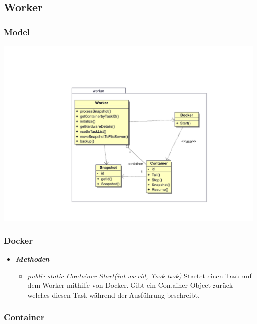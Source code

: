 \documentclass[a4paper,12pt]{article}
\begin{document}
\clearpage


\subsection{Worker}

\subsubsection{Model}

\includegraphics[width=\textwidth]{worker}

\subsubsection{Docker}

\begin{itemize}[label={}]

	\item\textit{\textbf{Methoden}}
		\begin{itemize}[label={\textbullet}]
			\item\textit{public static Container Start(int userid, Task task)} Startet einen Task auf dem Worker mithilfe von Docker. Gibt ein Container Object zurück welches diesen Task während der Ausführung beschreibt.
			
		\end{itemize}
\end{itemize}

\subsubsection{Container}
\end{document}
